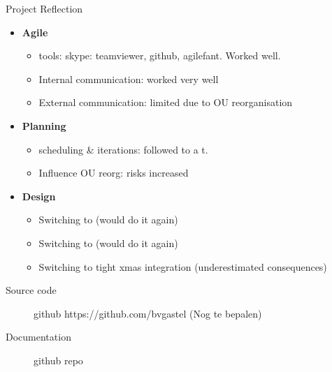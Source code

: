 \documentclass[11pt]{beamer}
\begin{document}
\begin{frame}{Project Reflection}
	\begin{itemize}
		\item {\bf Agile} 
				\begin{itemize}
					\item tools: skype: teamviewer, github, agilefant. Worked well.
					\item Internal communication: worked very well
					\item External communication: limited due to OU reorganisation
				\end{itemize}
		\item {\bf Planning}
				\begin{itemize}
					\item scheduling \& iterations: followed to a t.
					\item Influence OU reorg: risks increased
				\end{itemize}
		\item {\bf Design} 
			\begin{itemize}
				\item Switching to \qt				 (would do it again)
				\item Switching to \qml				 (would do it again)
				\item Switching to tight xmas integration (underestimated consequences)
			\end{itemize}
	\end{itemize}
\end{frame}

\begin{frame}
	\begin{description}
		\item[Source code] github https://github.com/bvgastel (Nog te bepalen)
		\item[Documentation] github repo
	\end{description}
\end{frame}
\end{document}
